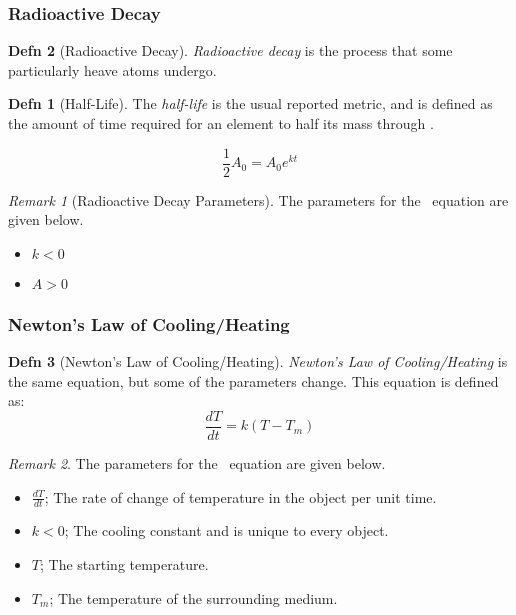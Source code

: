 \documentclass[10pt,letterpaper,final,twoside,notitlepage]{article}
\theoremstyle{plain}
\theoremstyle{definition}
\newtheorem{definition}{Defn}
\theoremstyle{remark}
\newtheorem{remark}{Remark}[definition]
\begin{document}
		\subsubsection{Radioactive Decay} \label{subsubsec:Radioactive Decay}
			\begin{definition}[Radioactive Decay] \label{def:Radioactive Decay}
				\emph{Radioactive decay} is the process that some particularly heave atoms undergo.
				\begin{definition}[Half-Life] \label{subdef:Half-Life}
					The \emph{half-life} is the usual reported metric, and is defined as the amount of time required for an element to half its mass through .
				\end{definition}
				\begin{equation} \label{eq:Radioactive Decay}
					\frac{1}{2} A_{0} = A_{0} e^{kt}
				\end{equation}
				\begin{remark}[Radioactive Decay Parameters] \label{rmk:Radioactive Decay Parameters}
					The parameters for the ~equation are given below.
					\begin{itemize}[noitemsep, nolistsep]
						\item $k<0$
						\item $A>0$
					\end{itemize}
				\end{remark}
			\end{definition}
		\subsubsection{Newton's Law of Cooling/Heating} \label{subsubsec:Newton Law of Cooling/Heating}
			\begin{definition}[Newton's Law of Cooling/Heating] \label{def:Newton Law of Cooling/Heating}
				\emph{Newton's Law of Cooling/Heating} is the same equation, but some of the parameters change.
				This equation is defined as:
				\begin{equation} \label{eq:Newton Law of Cooling/Heating}
					\frac{dT}{dt} = k \left( T-T_{m} \right)
				\end{equation}
				\begin{remark} \label{rmk:Newton Law of Cooling/Heating Parameters}
					The parameters for the ~equation are given below.
					\begin{itemize}[noitemsep, nolistsep]
						\item $\frac{dT}{dt}$; The rate of change of temperature in the object per unit time.
						\item $k<0$; The cooling constant and is unique to every object.
						\item $T$; The starting temperature.
						\item $T_{m}$; The temperature of the surrounding medium.
					\end{itemize}
				\end{remark}
			\end{definition}
\end{document}
